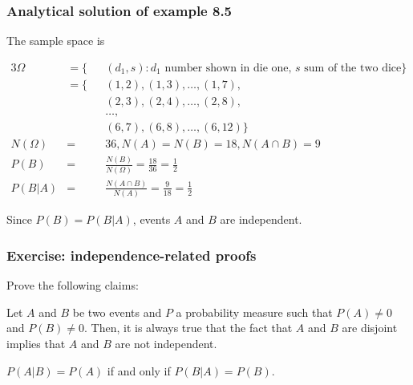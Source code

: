 \begin{frame}
    \frametitle{Analytical solution of example 8.5}

    \scriptsize
    The sample space is

    \begin{alignat*}{3}
        \Omega&=\{&&(d_1, s): d_1\text{ number shown in die one, }s\text{ sum of the two dice}\}\\
              &=\{&&(1,2),(1,3),\ldots,(1,7),\\
              &   &&(2,3),(2,4),\ldots,(2,8),\\
              &   &&\ldots,\\
              &   &&(6,7),(6,8),\ldots,(6,12)\}\\
        N(\Omega)&=&&36,N(A)=N(B)=18,N(A\cap B)=9\\
        P(B)&=     &&\frac{N(B)}{N(\Omega)}=\frac{18}{36}=\frac{1}{2}\\
        P(B|A)&=   &&\frac{N(A\cap B)}{N(A)}=\frac{9}{18}=\frac{1}{2}
    \end{alignat*}

    Since $P(B)=P(B|A)$, events $A$ and $B$ are independent.
    \normalsize
\end{frame}

\begin{frame}
    \frametitle{Exercise: independence-related proofs}

    Prove the following claims:

    \begin{claim*}

        Let $A$ and $B$ be two events and $P$ a probability measure such that
        $P(A)\ne 0$ and $P(B)\ne 0$. Then, it is always true that the fact that
        $A$ and $B$ are disjoint implies that $A$ and $B$ are not independent.

    \end{claim*}

    \begin{claim*}
        $P(A|B)=P(A)$ if and only if $P(B|A)=P(B)$.
    \end{claim*}
\end{frame}

\begin{comment}
\begin{frame}
    \frametitle{Example}

- Example 8.6 (uses birthday problem, example 7.10)

\end{frame}
\end{comment}

